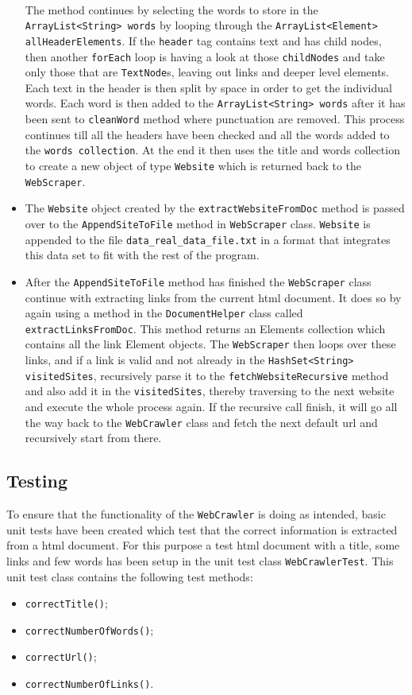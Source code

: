 \begin{itemize}
\\
The method continues by selecting the words to store in the {\tt ArrayList<String> words} by looping through the {\tt ArrayList<Element> allHeaderElements}. If the {\tt header} tag contains text and has child nodes, then another {\tt forEach} loop is having a look at those {\tt childNodes} and take only those that are {\tt TextNode}s, leaving out links and deeper level elements.
Each text in the header is then split by space in order to get the individual words. Each word is then added to the {\tt ArrayList<String> words} after it has been sent to {\tt cleanWord} method where punctuation are removed.  This process continues till all the headers have been checked and all the words added to the {\tt words collection}.  At the end it then uses the title and words collection to create a new object of type {\tt Website} which is returned back to the {\tt WebScraper}. 
\item The {\tt Website} object created by the {\tt extractWebsiteFromDoc} method is passed over to the {\tt AppendSiteToFile} method in {\tt WebScraper} class. {\tt Website} is appended to the file {\tt data\_real\_data\_file.txt} in a format that integrates this data set to fit with the rest of the program.
\item After the {\tt AppendSiteToFile} method has finished the {\tt WebScraper} class continue with extracting links from the current html document. It does so by again using a method in the {\tt DocumentHelper} class called {\tt extractLinksFromDoc}. This method returns an Elements collection which contains all the link Element objects. The {\tt WebScraper} then loops over these links, and if a link is valid and not already in the {\tt HashSet<String> visitedSites}, recursively parse it to the {\tt fetchWebsiteRecursive} method and also add it in the {\tt visitedSites}, thereby traversing to the next website and execute the whole process again. If the recursive call finish, it will go all the way back to the {\tt WebCrawler} class and fetch the next default url and recursively start from there.
\end{itemize}


\subsection{Testing}
To ensure that the functionality of the {\tt WebCrawler} is doing as intended, basic unit tests have been created which test that the correct information is extracted from a html document. For this purpose a test html document with a title, some links and few words has been setup in the unit test class {\tt WebCrawlerTest}. This unit test class contains the following test methods:
\begin{itemize}
\item {\tt correctTitle()};
\item {\tt correctNumberOfWords()};
\item {\tt correctUrl()};
\item {\tt correctNumberOfLinks()}.
\end{itemize}

